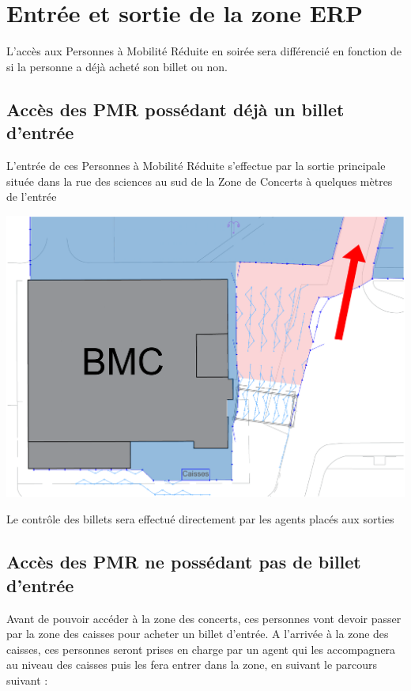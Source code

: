 \documentclass[hidelinks, paper=a4, fontsize=13pt]{report}
\begin{document}
\section{Entrée et sortie de la zone ERP}
L’accès aux Personnes à Mobilité Réduite en soirée sera différencié en fonction de si la personne a déjà acheté son billet ou non.

\subsection{Accès des PMR possédant déjà un billet d’entrée}


L’entrée de ces Personnes à Mobilité Réduite s’effectue par la sortie principale située dans la rue des sciences au sud de la Zone de Concerts à quelques mètres de l’entrée


\begin{center}
\includegraphics[width=.8\textwidth,keepaspectratio]{Exports/Plan_24h_44eme-Acces_PMR_ac_Billet}
\end{center}


Le contrôle des billets sera effectué directement par les agents placés aux sorties


\subsection{Accès des PMR ne possédant pas de billet d’entrée}

Avant de pouvoir accéder à la zone des concerts, ces personnes vont devoir passer par la zone des caisses pour acheter un billet d’entrée. A l’arrivée à la zone des caisses, ces personnes seront prises en charge par un agent qui les accompagnera au niveau des caisses puis les fera entrer dans la zone, en suivant le parcours suivant :
\end{document}
